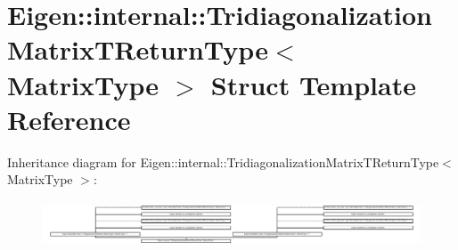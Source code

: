 \hypertarget{struct_eigen_1_1internal_1_1_tridiagonalization_matrix_t_return_type}{}\section{Eigen\+:\+:internal\+:\+:Tridiagonalization\+Matrix\+T\+Return\+Type$<$ Matrix\+Type $>$ Struct Template Reference}
\label{struct_eigen_1_1internal_1_1_tridiagonalization_matrix_t_return_type}
Inheritance diagram for Eigen\+:\+:internal\+:\+:Tridiagonalization\+Matrix\+T\+Return\+Type$<$ Matrix\+Type $>$\+:\begin{figure}[H]
\begin{center}
\leavevmode
\includegraphics[height=1.361426cm]{struct_eigen_1_1internal_1_1_tridiagonalization_matrix_t_return_type}
\end{center}
\end{figure}
